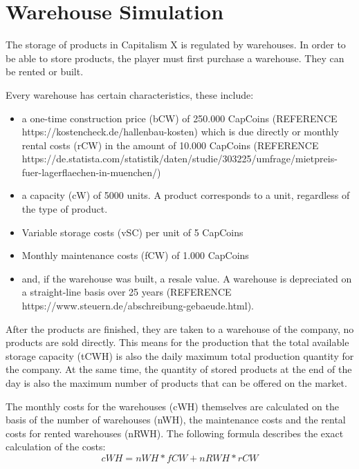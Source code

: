 \section{Warehouse Simulation} \label{warehouse_simulation}


The storage of products in Capitalism X is regulated by warehouses. In order to be able to store products, the player must first purchase a warehouse. They can be rented or built.

Every warehouse has certain characteristics, these include:
\begin{itemize}
    \item a one-time construction price (\gls{bCW}) of 250.000 CapCoins (REFERENCE https://kostencheck.de/hallenbau-kosten) which is due directly or monthly rental costs (\gls{rCW}) in the amount of 10.000 CapCoins (REFERENCE https://de.statista.com/statistik/daten/studie/303225/umfrage/mietpreis-fuer-lagerflaechen-in-muenchen/)
    \item a capacity (\gls{cW}) of 5000 units. A product corresponds to a unit, regardless of the type of product.
    \item Variable storage costs (\gls{vSC}) per unit of 5 CapCoins
    \item Monthly maintenance costs (\gls{fCW}) of 1.000 CapCoins
    \item and, if the warehouse was built, a resale value. A warehouse is depreciated on a straight-line basis over 25 years (REFERENCE https://www.steuern.de/abschreibung-gebaeude.html).
\end{itemize}

After the products are finished, they are taken to a warehouse of the company, no products are sold directly. This means for the production that the total available storage capacity (\gls{tCWH}) is also the daily maximum total production quantity for the company. At the same time, the quantity of stored products at the end of the day is also the maximum number of products that can be offered on the market. 

The monthly costs for the warehouses (\gls{cWH}) themselves are calculated on the basis of the number of warehouses (\gls{nWH}), the maintenance costs and the rental costs for rented warehouses (\gls{nRWH}). The following formula describes the exact calculation of the costs:
\begin{equation}
     cWH = nWH * fCW + nRWH * rCW
\end{equation}

